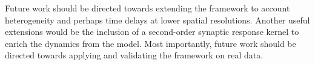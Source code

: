 \documentclass[journal,a4paper]{IEEEtran}
\begin{document}
Future work should be directed towards extending the framework to account heterogeneity and perhaps time delays at lower spatial resolutions. Another useful extensions would be the inclusion of a second-order synaptic response kernel to enrich the dynamics from the model. Most importantly, future work should be directed towards applying and validating the framework on real data.





\ifCLASSOPTIONcaptionsoff
  \newpage
\fi

  \newpage
%  
% 


 
\end{document}
